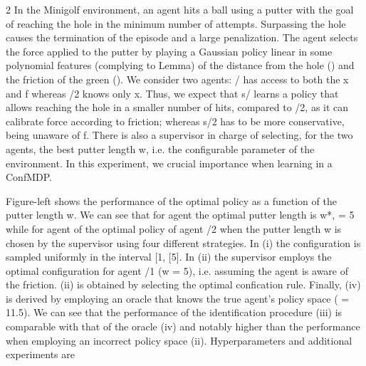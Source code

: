 \documentclass{article}
\begin{document}
\begin{paracol}{2}
In the Minigolf environment, an agent hits a ball using a putter with the goal of reaching the hole in the minimum number of attempts. Surpassing the hole causes the termination
of the episode and a large penalization. The agent selects the
force applied to the putter by playing a Gaussian policy linear in some polynomial features (complying to Lemma) of
the distance from the hole () and the friction of the green
(). We consider two agents: / has access to both the x and
f whereas /2 knows only x. Thus, we expect that s/ learns
a policy that allows reaching the hole in a smaller number of
hits, compared to /2, as it can calibrate force according to
friction; whereas s/2 has to be more conservative, being unaware of f. There is also a supervisor in charge of selecting,
for the two agents, the best putter length w, i.e. the configurable parameter of the environment. In this experiment, we
crucial importance when learning in a ConfMDP.


Figure-left shows the performance of the optimal policy
as a function of the putter length w. We can see that for agent
 the optimal putter length is w*, = 5 while for agent
of the optimal policy of agent /2 when the putter length w
is chosen by the supervisor using four different strategies.
In (i) the configuration is sampled uniformly in the interval
[1, [5]. In (ii) the supervisor employs the optimal configuration for agent /1 (w = 5), i.e. assuming the agent is aware
of the friction. (ii) is obtained by selecting the optimal confication rule. Finally, (iv) is derived by employing an oracle
that knows the true agent's policy space ( = 11.5). We can
see that the performance of the identification procedure (iii)
is comparable with that of the oracle (iv) and notably higher
than the performance when employing an incorrect policy
space (ii). Hyperparameters and additional experiments are

\end{paracol}
\end{document}

